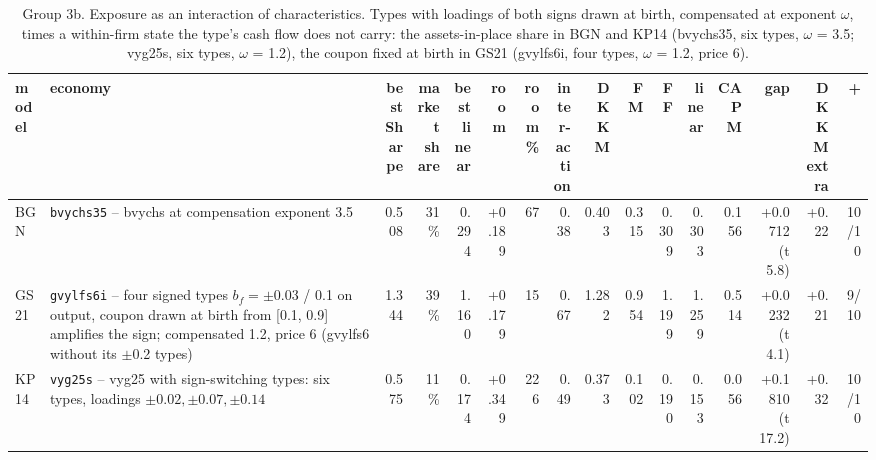 \begin{table}[htbp]\centering\footnotesize\setlength{\tabcolsep}{2pt}
\caption{Group 3b. Exposure as an interaction of characteristics. Types with loadings of both signs drawn at birth, compensated at exponent $\omega$, times a within-firm state the type's cash flow does not carry: the assets-in-place share in BGN and KP14 (bvychs35, six types, $\omega$ = 3.5; vyg25s, six types, $\omega$ = 1.2), the coupon fixed at birth in GS21 (gvylfs6i, four types, $\omega$ = 1.2, price 6).}\label{tab:g3b}
\begin{adjustbox}{max width=\textwidth}\begin{tabular}{l>{\raggedright\arraybackslash}p{3.6cm}rrrrrrrrrrrrrr}\hline
model & economy & \shortstack[r]{best\\Sharpe} & \shortstack[r]{market\\share} & \shortstack[r]{best\\linear} & room & \shortstack[r]{room\\\%} & \shortstack[r]{inter-\\action} & DKKM & FM & FF & linear & CAPM & gap & \shortstack[r]{DKKM\\extra} & + \\\hline
BGN & \texttt{bvychs35} -- bvychs at compensation exponent 3.5 & 0.508 & 31\% & 0.294 & +0.189 & 67 & 0.38 & 0.403 & 0.315 & 0.309 & 0.303 & 0.156 & +0.0712 (t 5.8) & +0.22 & 10/10 \\
GS21 & \texttt{gvylfs6i} -- four signed types $b_f = \pm$0.03 / 0.1 on output, coupon drawn at birth from [0.1, 0.9] amplifies the sign; compensated 1.2, price 6 (gvylfs6 without its $\pm$0.2 types) & 1.344 & 39\% & 1.160 & +0.179 & 15 & 0.67 & 1.282 & 0.954 & 1.199 & 1.259 & 0.514 & +0.0232 (t 4.1) & +0.21 & 9/10 \\
KP14 & \texttt{vyg25s} -- vyg25 with sign-switching types: six types, loadings $\pm 0.02, \pm 0.07, \pm 0.14$ & 0.575 & 11\% & 0.174 & +0.349 & 226 & 0.49 & 0.373 & 0.102 & 0.190 & 0.153 & 0.056 & +0.1810 (t 17.2) & +0.32 & 10/10 \\
\hline\end{tabular}\end{adjustbox}\end{table}

